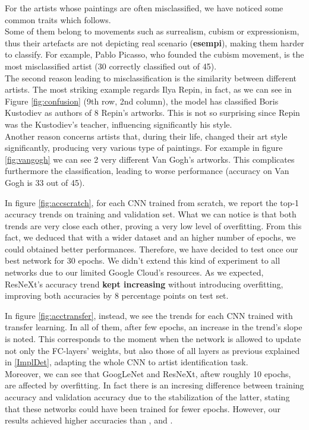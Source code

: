 \documentclass{article}
\begin{document}
For the artists whose paintings are often misclassified, we have noticed some common traits which follows.\\
Some of them belong to movements such as surrealism, cubism or expressionism, thus their artefacts are not depicting real scenario (\textbf{esempi}), making them harder to classify.
For example, Pablo Picasso, who founded the cubism movement, is the most misclassified artist (30 correctly classified out of 45).\\
The second reason leading to misclassification is the similarity  between different artists. The most striking example regards Ilya Repin, in fact, as we can see in Figure \ref{fig:confusion} (9th row, 2nd column), the model has classified Boris Kustodiev as authors of 8 Repin's artworks. This is not so surprising since Repin was the Kustodiev's teacher, influencing significantly his style. \\
Another reason concerns artists that, during their life, changed their art style significantly, producing very various type of paintings. For example in figure \ref{fig:vangogh} we can see 2 very different Van Gogh's artworks. This complicates furthermore the classification, leading to worse performance (accuracy on Van Gogh is 33 out of 45).

In figure \ref{fig:accscratch}, for each CNN trained from scratch,  we report the top-1 accuracy trends on training and validation set. What we can notice is that both trends are very close each other, proving a very low level of overfitting.
From this fact, we deduced that with a wider dataset and an higher number of epochs, we could obtained better performances. Therefore, we have decided to test once our best network for 30 epochs. We didn't extend this kind of experiment to all networks due to our limited Google Cloud's resources. As we expected, ResNeXt's accuracy trend \textbf{kept increasing} without introducing overfitting, improving both accuracies by 8 percentage points on test set.

In figure \ref{fig:acctransfer}, instead, we see the trends for each CNN trained with transfer learning. In all of them, after few epochs, an increase in the trend's slope is noted. This corresponds to the moment when the network is allowed to update not only the FC-layers' weights, but also those of all layers as previous explained in \ref{ImplDet}, adapting the whole CNN to artist identification task.\\
Moreover, we can see that GoogLeNet and ResNeXt, aftew roughly 10 epochs, are affected by overfitting. In fact there is an incresing difference between training accuracy and validation accuracy due to the stabilization of the latter, stating that these networks could have been trained for fewer epochs.  However, our results achieved higher accuracies than \cite{ArtistIdCNN406}, \cite{Saleh2015} and \cite{mensink2014}.
\end{document}
